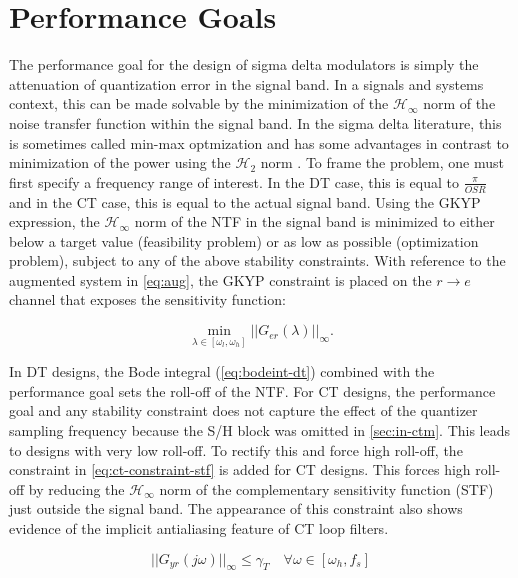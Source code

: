 \section{Performance Goals}
\label{sec:stab-perf}

The performance goal for the design of sigma delta modulators is simply the attenuation of quantization error in the signal band. In a signals and systems context, this can be made solvable by the minimization of the $\mathcal{H}_\infty$ norm of the noise transfer function within the signal band. In the sigma delta literature, this is sometimes called min-max optmization and has some advantages in contrast to minimization of the power using the $\mathcal{H}_2$ norm \cite{Nagahara2012}. To frame the problem, one must first specify a frequency range of interest. In the \gls{DT} case, this is equal to $\frac{\pi}{OSR}$ and in the \gls{CT} case, this is equal to the actual signal band. Using the \gls{GKYP} expression, the $\mathcal{H}_\infty$ norm of the \gls{NTF} in the signal band is minimized to either below a target value (feasibility problem) or as low as possible (optimization problem), subject to any of the above stability constraints. With reference to the augmented system in \autoref{eq:aug}, the \gls{GKYP} constraint is placed on the $r \rightarrow e$ channel that exposes the sensitivity function:

\begin{equation}
	\min_{\lambda \in [\omega_l, \omega_h]} ||G_{er}(\lambda)||_\infty \label{eq:perf}.
\end{equation}

In \gls{DT} designs, the Bode integral (\ref{eq:bodeint-dt}) combined with the performance goal sets the roll-off of the \gls{NTF}. For \gls{CT} designs, the performance goal and any stability constraint does not capture the effect of the quantizer sampling frequency because the \gls{S/H} block was omitted in \autoref{sec:in-ctm}. This leads to designs with very low roll-off. To rectify this and force high roll-off, the constraint in \ref{eq:ct-constraint-stf} is added for \gls{CT} designs. This forces high roll-off by reducing the $\mathcal{H}_\infty$ norm of the complementary sensitivity function (\gls{STF}) just outside the signal band. The appearance of this constraint also shows evidence of the implicit antialiasing feature of \gls{CT} loop filters.

\begin{equation}
	||G_{yr}(j\omega)||_\infty \leq \gamma_{T} \quad \forall \omega \in [\omega_h, f_s] \label{eq:ct-constraint-stf}
\end{equation}